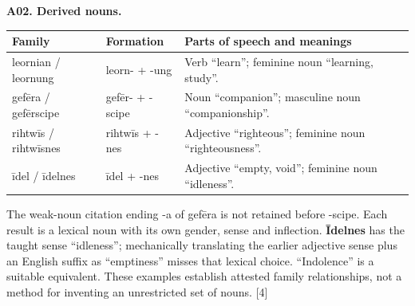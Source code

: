 \par\begin{minipage}{\linewidth}\raggedright
\textbf{A02. Derived nouns.}

\par\begingroup
\fontsize{10.5}{13.2}\selectfont
\setlength{\LTleft}{0pt}\setlength{\LTright}{\fill}
\noindent
\begin{tabular}{@{}>{\raggedright\arraybackslash}p{29.17mm}>{\raggedright\arraybackslash}p{23.53mm}>{\raggedright\arraybackslash}p{65.68mm}@{}}
\toprule
\textbf{Family} & \textbf{Formation} & \textbf{Parts of speech and meanings} \\
\midrule
leornian /\allowbreak{} leornung & leorn- + -ung & Verb “learn”; feminine noun “learning, study”. \\
gefēra /\allowbreak{} gefērscipe & gefēr- + -scipe & Noun “companion”; masculine noun “companionship”. \\
rihtwīs /\allowbreak{} rihtwīsnes & rihtwīs + -nes & Adjective “righteous”; feminine noun “righteousness”. \\
īdel /\allowbreak{} īdelnes & īdel + -nes & Adjective “empty, void”; feminine noun “idleness”. \\
\bottomrule
\end{tabular}
\par\endgroup

The weak-noun citation ending -a of gefēra is not retained before -scipe. Each result is a lexical noun with its own gender, sense and inflection. \textbf{Īdelnes} has the taught sense “idleness”; mechanically translating the earlier adjective sense plus an English suffix as “emptiness” misses that lexical choice. “Indolence” is a suitable equivalent. These examples establish attested family relationships, not a method for inventing an unrestricted set of nouns. [4]

\end{minipage}\par\addvspace{4pt}

